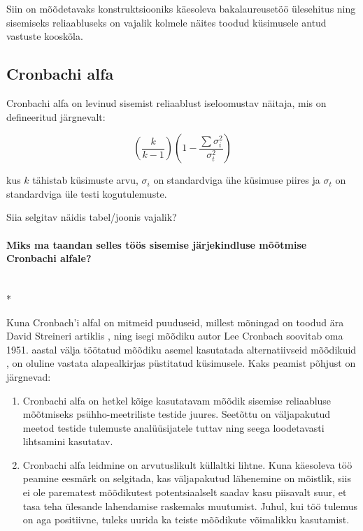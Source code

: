 \documentclass[a4paper]{article}
\numberwithin{equation}{section}
\theoremstyle{definition}
\begin{document}
Siin on mõõdetavaks konstruktsiooniks käesoleva bakalaureusetöö \"ulesehitus ning sisemiseks reliaabluseks on vajalik kolmele näites toodud k\"usimusele antud vastuste kooskõla.



\subsection{Cronbachi alfa}

Cronbachi alfa on levinud sisemist reliaablust iseloomustav näitaja, mis on defineeritud järgnevalt:

\begin{equation}
(\frac{k}{k-1})( 1 - \frac{\sum \sigma_i^2}{\sigma_t^2})
\end{equation}

kus $k$ tähistab k\"usimuste arvu, $\sigma_i$ on standardviga \"uhe k\"usimuse piires ja $\sigma_t$ on standardviga \"ule testi kogutulemuste.\cite[396]{Cronbach2004}

{\color{cyan} Siia selgitav näidis tabel/joonis vajalik?}


\paragraph{Miks ma taandan selles töös sisemise järjekindluse mõõtmise Cronbachi alfale?}\mbox{}\\*

Kuna Cronbach'i alfal on mitmeid puuduseid, millest mõningad on toodud ära David Streineri artiklis \cite[101-102]{Streiner2010}, ning isegi mõõdiku autor Lee Cronbach soovitab oma 1951. aastal välja töötatud mõõdiku asemel kasutatada alternatiivseid mõõdikuid \cite{Cronbach2004}, on oluline vastata alapealkirjas p\"ustitatud k\"usimusele. Kaks peamist põhjust on järgnevad:
\begin{enumerate}[I]
\item Cronbachi alfa on hetkel kõige kasutatavam mõõdik sisemise reliaabluse mõõtmiseks ps\"uhho-meetriliste testide juures. Seetõttu on väljapakutud meetod testide tulemuste anal\"u\"usijatele tuttav ning seega loodetavasti lihtsamini kasutatav.
\item Cronbachi alfa leidmine on arvutuslikult k\"ullaltki lihtne. Kuna käesoleva töö peamine eesmärk on selgitada, kas väljapakutud lähenemine on mõistlik, siis ei ole parematest mõõdikutest potentsiaalselt saadav kasu piisavalt suur, et tasa teha \"ulesande lahendamise raskemaks muutumist. Juhul, kui töö tulemus on aga positiivne,  tuleks uurida ka teiste mõõdikute võimalikku kasutamist.

\end{enumerate}
\end{document}
